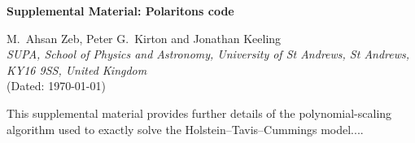 \documentclass[final,twocolumn]{elsarticle}
\begin{document}














\onecolumn



\renewcommand{\theequation}{S\arabic{equation}}
\setcounter{equation}{0}
\renewcommand{\thefigure}{S\arabic{figure}}
\setcounter{figure}{0}
\setcounter{section}{0}

\clearpage

\begin{center}
\textbf{\large Supplemental Material: Polaritons code}

\vspace{0.4cm}

{M.\ Ahsan Zeb, Peter G.\ Kirton and Jonathan Keeling} \\
\textit{SUPA, School of Physics and Astronomy, University of St Andrews, St Andrews, KY16 9SS, United Kingdom}\\
(Dated: \today)

\end{center}
\vspace{\columnsep}

This supplemental material provides further details of the polynomial-scaling
algorithm used to exactly solve the Holstein--Tavis--Cummings model....
\end{document}
